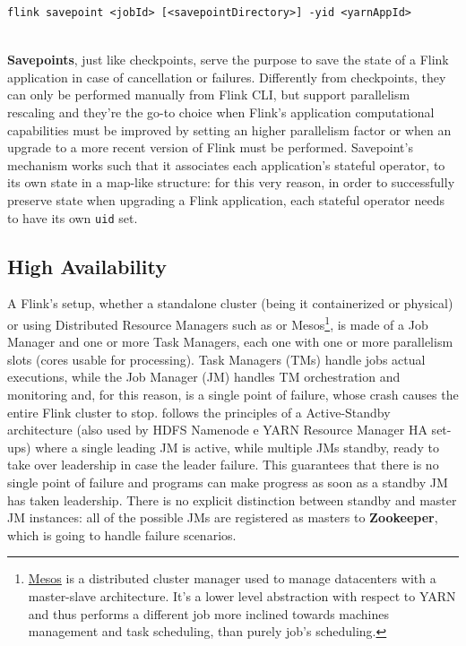 \begin{code}
    \label{code:savepoint}
    \begin{verbatim}
flink savepoint <jobId> [<savepointDirectory>] -yid <yarnAppId> 
    \end{verbatim}
\end{code}~\\

\textbf{Savepoints}, just like checkpoints, serve the purpose to save the state of a Flink application in case of cancellation or failures. Differently from checkpoints, they can only be performed manually from Flink CLI, but support parallelism rescaling and they're the go-to choice when Flink's application computational capabilities must be improved by setting an higher parallelism factor or when an upgrade to a more recent version of Flink must be performed. Savepoint's mechanism works such that it associates each application's stateful operator, to its own state in a map-like structure: for this very reason, in order to successfully preserve state when upgrading a Flink application, each stateful operator needs to have its own \texttt{uid} set.

\subsection{High Availability}

A Flink's setup, whether a standalone cluster (being it containerized or physical) or using Distributed Resource Managers such as  or Mesos\footnote{\href{https://mesos.apache.org/}{Mesos} is a distributed cluster manager used to manage datacenters with a master-slave architecture. It's a lower level abstraction with respect to YARN and thus performs a different job more inclined towards machines management and task scheduling, than purely job's scheduling.}, is made of a Job Manager and one or more Task Managers, each one with one or more parallelism slots (cores usable for processing). Task Managers (TMs) handle jobs actual executions, while the Job Manager (JM) handles TM orchestration and monitoring and, for this reason, is a single point of failure, whose crash causes the entire Flink cluster to stop.
follows the principles of a Active-Standby architecture (also used by HDFS Namenode e YARN Resource Manager HA set-ups) where a single leading JM is active, while multiple JMs standby, ready to take over leadership in case the leader failure. This guarantees that there is no single point of failure and programs can make progress as soon as a standby JM has taken leadership. There is no explicit distinction between standby and master JM instances: all of the possible JMs are registered as masters to \textbf{Zookeeper}, which is going to handle failure scenarios.

